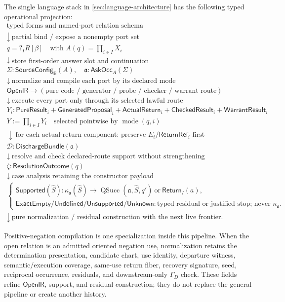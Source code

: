 \documentclass[11pt,oneside]{article}
\newcommand{\B}{\mathbb B}
\newcommand{\OpenIR}{\mathsf{OpenIR}}
\newcommand{\ReturnRef}{\mathsf{ReturnRef}}
\newcommand{\QSucc}{\operatorname{QSucc}}
\newcommand{\AskRef}{\mathfrak a}
\begin{document}
The single language stack in \cref{sec:language-architecture} has the following typed operational
projection:
\[
\boxed{
\begin{array}{c}
\text{typed forms and named-port relation schema}\\
\downarrow\ \text{partial bind / expose a nonempty port set}\\
q=?_I R[\beta]\quad\text{with }A(q)=\prod_{i\in I}X_i\\
\downarrow\ \text{store first-order answer slot and continuation}\\
\Sigma:\mathsf{SourceConfig}_{\B}(A),\quad
\AskRef:\mathsf{AskOcc}_A(\Sigma)\\
\downarrow\ \text{normalize and compile each port by its declared mode}\\
\OpenIR\to(\text{pure code / generator / probe / checker / warrant route})\\
\downarrow\ \text{execute every port only through its selected lawful route}\\
Y_i:\mathsf{PureResult}_i+\mathsf{GeneratedProposal}_i+\mathsf{ActualReturn}_i
  +\mathsf{CheckedResult}_i+\mathsf{WarrantResult}_i\\
Y:=\prod_{i\in I}Y_i\quad\text{selected pointwise by }\operatorname{mode}(q,i)\\
\downarrow\ \text{for each actual-return component: preserve }E_i/\ReturnRef_i\text{ first}\\
\mathcal D:\mathsf{DischargeBundle}(\AskRef)\\
\downarrow\ \text{resolve and check declared-route support without strengthening}\\
\zeta:\mathsf{ResolutionOutcome}(q)\\
\downarrow\ \text{case analysis retaining the constructor payload}\\
\begin{cases}
\mathsf{Supported}(\widehat S):
  \kappa_{\AskRef}(\widehat S)
  \to \QSucc(\AskRef,\widehat S,q')\ \text{or}\ \mathsf{Return}_I(a),\\
\mathsf{ExactEmpty}/\mathsf{Undefined}/\mathsf{Unsupported}/\mathsf{Unknown}:
  \text{typed residual or justified stop; never }\kappa_{\AskRef}.
\end{cases}\\
\downarrow\ \text{pure normalization / residual construction with the next live frontier.}
\end{array}
}
\]

Positive-negation compilation is one specialization inside this pipeline.  When the open relation
is an admitted oriented negation use, normalization retains the determination presentation,
candidate chart, use identity, departure witness, semantic/execution coverage, same-use return
fiber, recovery signature, seed, reciprocal occurrence, residuals, and downstream-only
\(\Gamma_D\) check.  These fields refine \(\OpenIR\), support, and residual construction; they do
not replace the general pipeline or create another history.
\end{document}
